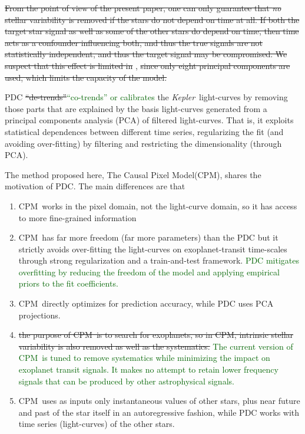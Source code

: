 \documentclass[12pt, preprint]{aastex}
\newcommand{\project}[1]{\textsl{#1}}
\newcommand{\Kepler}{\project{Kepler}}
\newcommand{\name}{CPM}
\newcommand{\revise}[1]{\textcolor{darkgreen}{#1}}
\newcommand{\remove}[1]{\sout{#1}}
\begin{document}
\remove{From the point of view of the present paper, 
one can only guarantee that {\em no} stellar variability is removed if the stars do not depend on time at all.
If both the target star signal as well as some of the other stars do depend on time, 
  then time acts as a confounder influencing both, and thus the true signals are not statistically independent, 
  and thus the target signal may be compromised. 
We suspect that this effect is limited in} \cite{pdc2,pdc3}, 
  \remove{since only eight principal components are used, which limits the capacity of the model.}

PDC \remove{``de-trends''}\revise{``co-trends'' or calibrates} the \Kepler\ light-curves by removing those parts that are explained by the basis light-curves
  generated from a principal components analysis (PCA) of filtered light-curves.
That is, it exploits statistical dependences between different time series, regularizing the fit (and avoiding over-fitting) 
  by filtering and restricting the dimensionality (through PCA).

The method proposed here, The Causal Pixel Model(\name), shares the motivation of PDC.
The main differences are that
\begin{enumerate}
\item
\name\ works in the pixel domain, not the light-curve domain, so it has access to more fine-grained information
\item
\name\ has far more freedom (far more parameters) than the PDC
  but it strictly avoids over-fitting the light-curves on exoplanet-transit time-scales
  through strong regularization and a train-and-test framework. 
  \revise{PDC mitigates overfitting by
reducing the freedom of the model and applying empirical priors to the
fit coefficients.}
\item 
\name\ directly optimizes for prediction accuracy, while PDC uses PCA projections.
\item
\remove{the purpose of \name\ is to search for exoplanets, so in \name, intrinsic stellar
  variability is also removed as well as the systematics.}
  \revise{The current version of \name\ is
tuned to remove systematics while minimizing the impact on exoplanet
transit signals. It makes no attempt to retain lower frequency signals
that can be produced by other astrophysical signals.}
\item 
\name\ uses as inputs only instantaneous values of other stars, plus near future and past of the star itself in an autoregressive fashion, while PDC works with time series (light-curves) of the other stars.
\end{enumerate}
\end{document}
